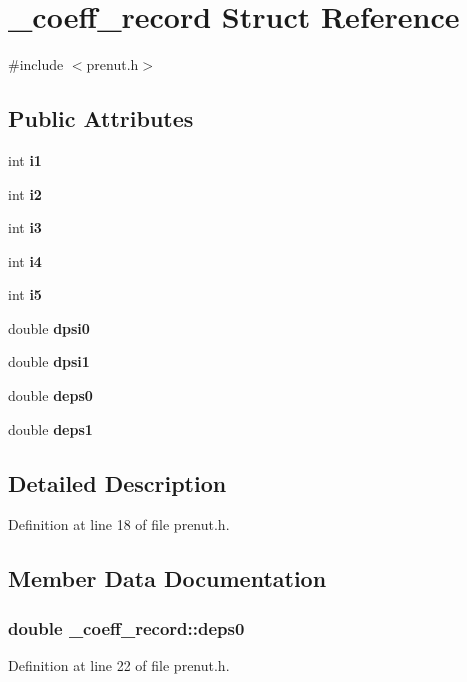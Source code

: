 \section{\-\_\-coeff\-\_\-record \-Struct \-Reference}
\label{struct__coeff__record}


{\ttfamily \#include $<$prenut.\-h$>$}

\subsection*{\-Public \-Attributes}
\begin{DoxyCompactItemize}
\item 
int {\bf i1}
\item 
int {\bf i2}
\item 
int {\bf i3}
\item 
int {\bf i4}
\item 
int {\bf i5}
\item 
double {\bf dpsi0}
\item 
double {\bf dpsi1}
\item 
double {\bf deps0}
\item 
double {\bf deps1}
\end{DoxyCompactItemize}


\subsection{\-Detailed \-Description}


\-Definition at line 18 of file prenut.\-h.



\subsection{\-Member \-Data \-Documentation}
\subsubsection[{deps0}]{\setlength{\rightskip}{0pt plus 5cm}double {\bf \-\_\-coeff\-\_\-record\-::deps0}}\label{struct__coeff__record_acbe46502ed00c85951b61cece826cb68}


\-Definition at line 22 of file prenut.\-h.

